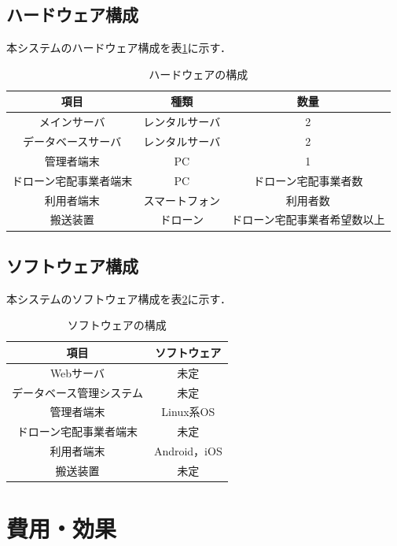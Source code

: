 \documentclass[a4paper, titlepage]{jsarticle}
\begin{document}
\subsection{ハードウェア構成}
本システムのハードウェア構成を表\ref{fig:hardware}に示す．
\begin{table}[H]
 \begin{center}
  \caption{ハードウェアの構成}
    \label{fig:hardware}
  \begin{tabular}{ccc} \hline
    項目 & 種類 & 数量 \\ \hline \hline
    メインサーバ & レンタルサーバ & 2 \\
    データベースサーバ & レンタルサーバ & 2 \\
    管理者端末 & PC & 1 \\
    ドローン宅配事業者端末 & PC & ドローン宅配事業者数 \\
    利用者端末 & スマートフォン & 利用者数 \\
    搬送装置 & ドローン & ドローン宅配事業者希望数以上 \\ \hline
  \end{tabular}
 \end{center}
\end{table}
\subsection{ソフトウェア構成}
本システムのソフトウェア構成を表\ref{fig:software}に示す．
\begin{table}[H]
 \begin{center}
  \caption{ソフトウェアの構成}
    \label{fig:software}
  \begin{tabular}{cc} \hline
    項目 & ソフトウェア \\ \hline \hline
    Webサーバ & 未定 \\
    データベース管理システム & 未定 \\
    管理者端末 & Linux系OS \\
    ドローン宅配事業者端末 & 未定 \\
    利用者端末 & Android，iOS \\
    搬送装置 & 未定 \\ \hline
  \end{tabular}
 \end{center}
\end{table}

\section{費用・効果}
\end{document}
